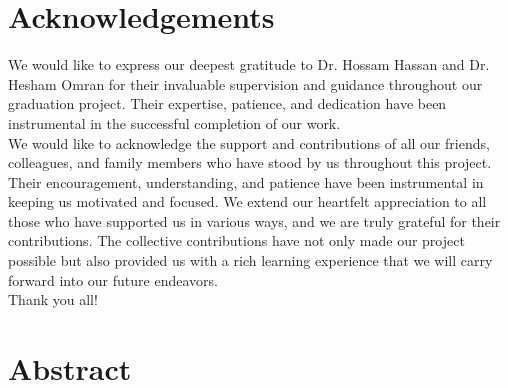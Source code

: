 \documentclass[12pt]{report}
\begin{document}
\newpage

\section*{Acknowledgements}

We would like to express our deepest gratitude to Dr. Hossam Hassan and Dr. Hesham Omran for their invaluable supervision and guidance throughout our graduation project. Their expertise, patience, and dedication have been instrumental in the successful completion of our work. \\
We would like to acknowledge the support and contributions of all our friends,
colleagues, and family members who have stood by us throughout this project. Their
encouragement, understanding, and patience have been instrumental in keeping us
motivated and focused. We extend our heartfelt appreciation to all those who have
supported us in various ways, and we are truly grateful for their contributions.
The collective contributions have not only made our project possible but also provided
us with a rich learning experience that we will carry forward into our future endeavors. \\
Thank you all!

\newpage

\section*{Abstract}
\end{document}
